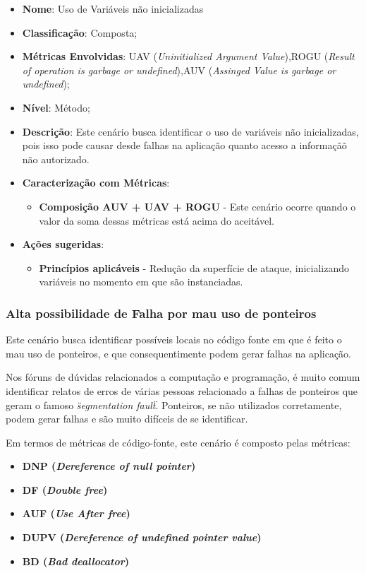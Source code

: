 \begin{itemize}
\item \textbf{Nome}: Uso de Variáveis não inicializadas
\item \textbf{Classificação}: Composta;
\item \textbf{Métricas Envolvidas}: UAV (\emph{Uninitialized Argument Value}),ROGU (\emph{Result of operation is garbage or undefined}),AUV (\emph{Assinged Value is garbage or undefined});
\item \textbf{Nível}: Método;
\item \textbf{Descrição}: Este cenário busca identificar o uso de variáveis não inicializadas, pois isso pode causar desde falhas na aplicação quanto acesso a informaçãõ não autorizado.
\item \textbf{Caracterização com Métricas}: 
	\begin{itemize}
	\item \textbf{Composição AUV + UAV + ROGU} - Este cenário ocorre quando o valor da soma dessas métricas está acima do aceitável.
	\end{itemize}
\item \textbf{Ações sugeridas}: 
	\begin{itemize}
	\item \textbf{Princípios aplicáveis} - Redução da superfície de ataque, inicializando variáveis no momento em que são instanciadas.
	\end{itemize}
\end{itemize}


\subsubsection{Alta possibilidade de Falha por mau uso de ponteiros}
Este cenário busca identificar possíveis locais no código fonte em que é feito o mau uso de ponteiros, e que consequentimente podem gerar falhas na aplicação. 

Nos fóruns de dúvidas relacionados a computação e programação, é muito comum identificar relatos de erros de várias pessoas relacionado a falhas de ponteiros que geram o famoso \emph{\"segmentation fault\"}. Ponteiros, se não utilizados corretamente, podem gerar falhas e são muito difíceis de se identificar.

Em termos de métricas de código-fonte, este cenário é composto pelas métricas:
\begin{itemize}
	\item \textbf{DNP (\emph{Dereference of null pointer})}
	\item \textbf{DF (\emph{Double free})}
	\item \textbf{AUF (\emph{Use After free})}
	\item \textbf{DUPV (\emph{Dereference of undefined pointer value})}
	\item \textbf{BD (\emph{Bad deallocator})}
\end{itemize}

